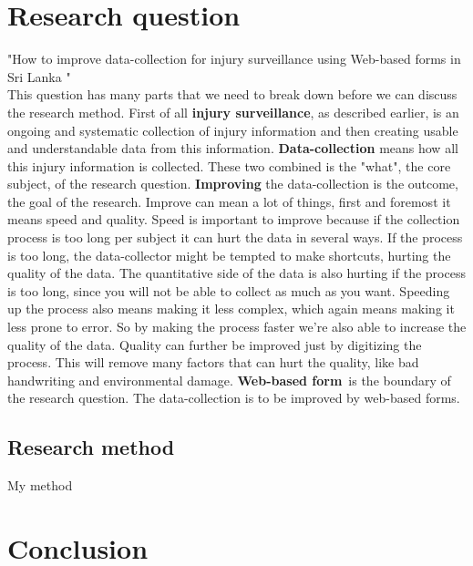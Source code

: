 \documentclass[UKenglish]{ifimaster}
\newcommand{\RQ}{How to improve data-collection for injury surveillance
using Web-based forms in Sri Lanka }
\newcommand{\is}{injury surveillance}
\begin{document}
\chapter*{Research question}
"\RQ"
\\
This question has many parts that we need to break down before we can discuss the research method.
First of all \textbf{\is}, as described earlier, is an ongoing and systematic collection of injury information and then creating usable
and understandable data from this information. \textbf{Data-collection} means how all this injury information is collected. These two combined is the "what", the core subject, of the research question.
\textbf{Improving} the data-collection is the outcome, the goal of the research. Improve can mean a lot of things, first and foremost it means speed and quality. 
Speed is important to improve because if the collection process is too long per subject it can hurt the data in several ways. If the process is too long, the data-collector might be tempted to make shortcuts, hurting the quality of the data.
The quantitative side of the data is also hurting if the process is too long, since you will not be able to collect as much as you want.
Speeding up the process also means making it less complex, which again means making it less prone to error. So by making the process faster we're also able to increase the quality of the data.
Quality can further be improved just by digitizing the process. This will remove many factors that can hurt the quality, like bad handwriting and environmental damage.
\textbf{Web-based form} is the boundary of the research question. The data-collection is to be improved by web-based forms.

\section{Research method}
My method

\chapter{Conclusion}

\backmatter{}
\printbibliography
\end{document}
